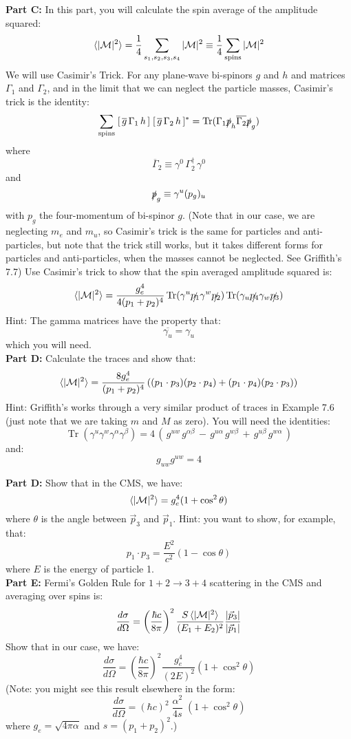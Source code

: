 \documentclass[12pt]{article}
\DeclareMathOperator{\Tr}{Tr}
\begin{document}
\noindent
{\bf Part C:}  In this part, you will calculate the spin average of the amplitude squared:
$$ \braket{|\mathcal{M}|^2} = \frac{1}{4}\sum_{s_1,s_2,s_3,s_4} |\mathcal{M}|^2 
\equiv \frac{1}{4}\sum_{\rm spins} |\mathcal{M}|^2$$
We will use Casimir's Trick.  For any plane-wave bi-spinors $g$ and $h$ and matrices $\Gamma_1$ and $\Gamma_2$, and in the limit that we can neglect the particle masses, Casimir's trick is the identity:
$$\sum_{\rm spins} \;[\,\overline{g}\,\Gamma_1 \,h\,]\;[\,\overline{g}\,\Gamma_2\,h\,]^* 
= \Tr(\Gamma_1 \slashed{p}_h \overline{\Gamma_2} \slashed{p}_g) $$
where 
$$\overline{\Gamma}_2 \equiv \gamma^0 \, \Gamma_2^\dagger \, \gamma^0$$
and
$$\slashed{p}_g \equiv \gamma^u (p_g)_u$$
with $p_g$ the four-momentum of bi-spinor $g$.
(Note that in our case, we are neglecting $m_e$ and $m_u$, so Casimir's trick is the same for particles and anti-particles, but note that the trick still works, but it takes different forms for particles and anti-particles, when the masses cannot be neglected. See Griffith's 7.7)  Use Casimir's trick to show that the spin averaged amplitude squared is:
$$\braket{|\mathcal{M}|^2} = \frac{g_e^4}{4(p_1+p_2)^4}
\Tr(\gamma^u\slashed{p_1}\gamma^w\slashed{p_2})
\Tr(\gamma_u\slashed{p_4}\gamma_w\slashed{p_3})$$
Hint: The gamma matrices have the property that:
$$\overline{\gamma_u} = \gamma_u$$
which you will need.\\[5pt]

\noindent
{\bf Part D:} Calculate the traces and show that:
$$ \braket{|\mathcal{M}|^2} 
= \frac{8 g_e^4}{(p_1+p_2)^4}
\left((p_1\cdot p_3)(p_2\cdot p_4) + (p_1\cdot p_4)(p_2\cdot p_3)\right)
$$
Hint: Griffith's works through a very similar product of traces in Example 7.6 (just note that we are taking $m$ and $M$ as zero).  You will need the identities:
$$\Tr(\gamma^u \gamma^w \gamma^\alpha \gamma^\beta) 
= 4 \, 
(    \, g^{uw}\,g^{\alpha \beta}
\, - \, g^{u\alpha}\,g^{w \beta}
\, + \, g^{u\beta}\,g^{w \alpha} \, )$$
and:
$$g_{uw}g^{uw} = 4$$


\noindent
{\bf Part D:} Show that in the CMS, we have:
$$ \braket{|\mathcal{M}|^2} = g_e^4 (1 + \cos^2 \theta)$$
where $\theta$ is the angle between $\vec{p}_3$ and $\vec{p}_1$. 
Hint: you want to show, for example, that:
$$p_1\cdot p_3 = \frac{E^2}{c^2}(1 - \cos \theta)$$
where $E$ is the energy of particle 1.\\[5pt]

\noindent
{\bf Part E:} Fermi's Golden Rule for $1+2 \to 3+4$ scattering in the CMS and averaging over spins is:
$$ \frac{d\sigma}{d\Omega} = \left( \frac{\hbar c}{8 \pi}\right)^2 \frac{S \braket{|\mathcal{M}|^2}
}{(E_1+E_2)^2}\frac{|\vec{p}_3|}{|\vec{p}_1|}$$
Show that in our case, we have:
$$\frac{d\sigma}{d\Omega} = \left( \frac{\hbar c}{8 \pi}\right)^2 \frac{g_e^4}{(2E)^2}
(1 + \cos^2 \theta)$$
(Note: you might see this result elsewhere in the form:
$$\frac{d\sigma}{d\Omega} = (\hbar c)^2 \; \frac{\alpha^2}{4s} \; (1 + \cos^2 \theta)$$
where $g_e = \sqrt{4\pi\alpha}$ and $s = (p_1 + p_2)^2$.)
\end{document}
